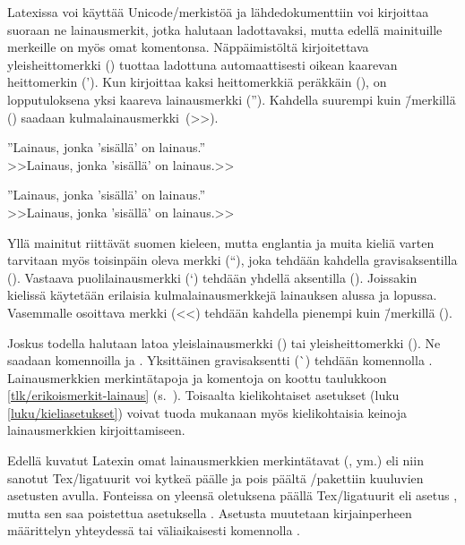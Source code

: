 Latexissa voi käyttää Unicode\-/merkistöä ja lähdedokumenttiin voi
kirjoittaa suoraan ne lainausmerkit, jotka halutaan ladottavaksi, mutta
edellä mainituille merkeille on myös omat komentonsa. Näppäimistöltä
kirjoitettava yleisheittomerkki () tuottaa ladottuna
automaattisesti oikean kaarevan heittomerkin ('). Kun kirjoittaa kaksi
heittomerkkiä peräkkäin (), on lopputuloksena yksi kaareva
lainausmerkki (''). Kahdella suurempi kuin \=/merkillä (\koodim{>>})
saadaan kulmalainausmerkki~(>>).

\begin{koodilohkosis}
''Lainaus, jonka 'sisällä' on lainaus.'' \\
>>Lainaus, jonka 'sisällä' on lainaus.>>
\end{koodilohkosis}

\begin{tulossis}
  ''Lainaus, jonka 'sisällä' on lainaus.'' \\
  >>Lainaus, jonka 'sisällä' on lainaus.>>
\end{tulossis}

\noindent
Yllä mainitut riittävät suomen kieleen, mutta englantia ja muita kieliä
varten tarvitaan myös toisinpäin oleva merkki (``), joka tehdään
kahdella gravisaksentilla (). Vastaava puolilainausmerkki (`)
tehdään yhdellä aksentilla (). Joissakin kielissä käytetään
erilaisia kulmalainausmerkkejä lainauksen alussa ja lopussa. Vasemmalle
osoittava merkki (<<) tehdään kahdella pienempi kuin \=/merkillä
(\koodim{<<}).

Joskus todella halutaan latoa yleislainausmerkki (\textquotedbl) tai
yleisheittomerkki (\textquotesingle). Ne saadaan komennoilla
 ja . Yksittäinen
gravisaksentti (\`{}) tehdään komennolla \komentoarg{}.
Lainausmerkkien merkintätapoja ja komentoja on koottu taulukkoon
\ref{tlk/erikoismerkit-lainaus}
(s.~\pageref{tlk/erikoismerkit-lainaus}). Toisaalta kielikohtaiset
asetukset (luku \ref{luku/kieliasetukset}) voivat tuoda mukanaan myös
kielikohtaisia keinoja lainausmerkkien kirjoittamiseen.

Edellä kuvatut Latexin omat lainausmerkkien merkintätavat (,
\koodi{>>} ym.) eli niin sanotut Tex\-/ligatuurit voi kytkeä päälle ja
pois päältä \-/pakettiin kuuluvien asetusten avulla.
Fonteissa on yleensä oletuksena päällä Tex\-/ligatuurit eli asetus
, mutta sen saa poistettua asetuksella
. Asetusta muutetaan kirjainperheen
määrittelyn yhteydessä tai väliaikaisesti komennolla
.

